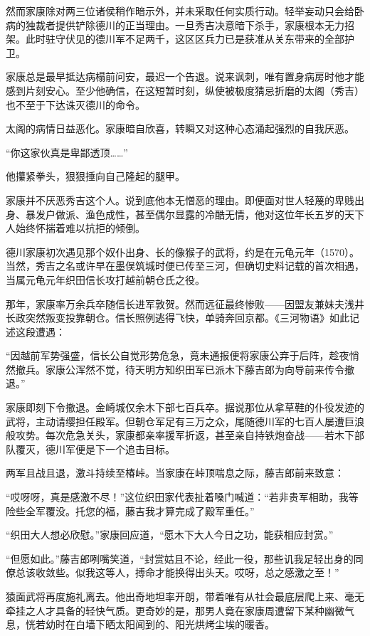 \documentclass[
]{book}
\begin{document}
然而家康除对两三位诸侯稍作暗示外，并未采取任何实质行动。轻举妄动只会给卧病的独裁者提供铲除德川的正当理由。一旦秀吉决意暗下杀手，家康根本无力招架。此时驻守伏见的德川军不足两千，这区区兵力已是获准从关东带来的全部护卫。

家康总是最早抵达病榻前问安，最迟一个告退。说来讽刺，唯有置身病房时他才能感到片刻安心。至少他确信，在这短暂时刻，纵使被极度猜忌折磨的太阁（秀吉）也不至于下达诛灭德川的命令。

太阁的病情日益恶化。家康暗自欣喜，转瞬又对这种心态涌起强烈的自我厌恶。

``你这家伙真是卑鄙透顶\ldots\ldots{}''

他攥紧拳头，狠狠捶向自己隆起的腿甲。

家康并不厌恶秀吉这个人。说到底他本无憎恶的理由。即便面对世人轻蔑的卑贱出身、暴发户做派、渔色成性，甚至偶尔显露的冷酷无情，他对这位年长五岁的天下人始终怀揣着难以抗拒的倾倒。

德川家康初次遇见那个奴仆出身、长的像猴子的武将，约是在元龟元年（1570）。当然，秀吉之名或许早在墨俣筑城时便已传至三河，但确切史料记载的首次相遇，当属元龟元年织田信长攻打越前朝仓氏之役。

那年，家康率万余兵卒随信长进军敦贺。然而远征最终惨败------因盟友兼妹夫浅井长政突然叛变投靠朝仓。信长照例逃得飞快，单骑奔回京都。《三河物语》如此记述这段遭遇：

``因越前军势强盛，信长公自觉形势危急，竟未通报便将家康公弃于后阵，趁夜悄然撤兵。家康公浑然不觉，待天明方知织田军已派木下藤吉郎为向导前来传令撤退。''

家康即刻下令撤退。金崎城仅余木下部七百兵卒。据说那位从拿草鞋的仆役发迹的武将，主动请缨担任殿军。但朝仓军足有三万之众，尾随德川军的七百人屡遭巨浪般攻势。每次危急关头，家康都亲率援军折返，甚至亲自持铁炮奋战------若木下部队覆灭，德川军便是下一个追击目标。

两军且战且退，激斗持续至椿峠。当家康在峠顶喘息之际，藤吉郎前来致意：

``哎呀呀，真是感激不尽！''这位织田家代表扯着嗓门喊道：``若非贵军相助，我等险些全军覆没。托您的福，藤吉我才算完成了殿军重任。''

``织田大人想必欣慰。''家康回应道，``愿木下大人今日之功，能获相应封赏。''

``但愿如此。''藤吉郎咧嘴笑道，``封赏姑且不论，经此一役，那些讥我足轻出身的同僚总该收敛些。似我这等人，搏命才能换得出头天。哎呀，总之感激之至！''

猿面武将再度施礼离去。他出奇地坦率开朗，带着唯有从社会最底层爬上来、毫无牵挂之人才具备的轻快气质。更奇妙的是，那男人竟在家康周遭留下某种幽微气息，恍若幼时在白墙下晒太阳闻到的、阳光烘烤尘埃的暖香。
\end{document}
